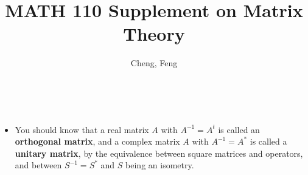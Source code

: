 \documentclass{article}
\title{MATH 110 Supplement on Matrix Theory}
\author{Cheng, Feng}
\newcommand{\df}[1]{\textbf{\textsf{#1}}}
\begin{document}
\makeatletter
\begin{center}
    {\Large \@title}
    \vspace{1em}
    \\ \@author
    \vspace{0.5em}
\end{center}
\makeatother
\begin{itemize}
    \item You should know that a real matrix $A$ with $A^{-1} = A^t$ is called an \df{orthogonal matrix}, and a complex matrix $A$ with $A^{-1} = A^*$ is called a \df{unitary matrix}, by the equivalence between square matrices and operators, and between $S^{-1} = S^*$ and $S$ being an isometry.
\end{itemize}
\end{document}
